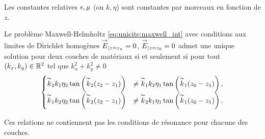     Les constantes relatives \(\epsilon,\mu\) (ou \(k,\eta\)) sont constantes par morceaux en fonction de \(z\).
    \begin{prop}
      \label{prop:unicite:interieur:postulat:multi-couche}
      Le problème Maxwell-Helmholtz \eqref{eq:unicite:maxwell_int} avec conditions aux limites de Dirichlet homogènes \({\overset{\rightarrow}{E}}_{|z=z_n} = 0\), \({\overset{\rightarrow}{E}}_{|z=z_0} = 0\) admet une unique solution pour deux couches de matériaux si et seulement si pour tout \((k_x,k_y) \in \mathbb R^2\) tel que \(k_x^2 + k_y^2 \not = 0\)
      \begin{align*}
        \begin{cases}
        \overset{\thicksim}{k}_2k_1\eta_2\tan\left(\overset{\thicksim}{k}_2(z_2-z_1)\right) & \not = \overset{\thicksim}{k}_1k_2\eta_1\tan\left(\overset{\thicksim}{k}_1(z_0-z_1)\right),
        \\
        \overset{\thicksim}{k}_1k_2\eta_2\tan\left(\overset{\thicksim}{k}_2(z_2-z_1)\right) & \not = \overset{\thicksim}{k}_2k_1\eta_1\tan\left(\overset{\thicksim}{k}_1(z_0-z_1)\right).
        \end{cases}
      \end{align*}
    \end{prop}
    Ces relations ne contiennent pas les conditions de résonance pour chacune des couches.
